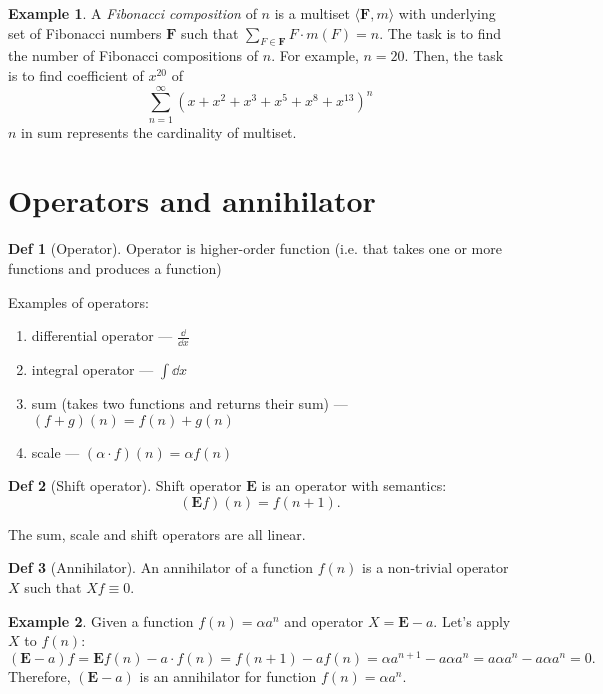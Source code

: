 \documentclass[a4paper]{article}
\theoremstyle{definition}
\newtheorem{definition}{Def}
\newtheorem{example}{Example}[section]
\begin{document}
\newcommand\FBS{\boldsymbol{F}}
\begin{example}
  A \textit{Fibonacci composition} of \(n\) is a multiset \(\langle \FBS, m
  \rangle\) with underlying set of Fibonacci numbers \(\FBS\)
  such that \(\sum_{F \in \FBS} F \cdot m(F) = n\).
  The task is to find the number of Fibonacci compositions of \(n\).
  For example, \(n = 20\).
  Then, the task is to find coefficient of  \(x^{20}\) of
  \[
     \sum_{n = 1}^{\infty} (x + x^2 + x^3 + x^5 + x^8 + x^{13})^n
  \]
  \(n\) in sum represents the cardinality of multiset.
\end{example}



\section{Operators and annihilator}

\begin{definition}[Operator]
  Operator is higher-order function (i.e. that takes one or more functions and
  produces a function)
\end{definition}
Examples of operators:
\begin{enumerate}
  \item differential operator --- \(\frac{\dd}{\dd x}\)
  \item integral operator --- \(\int \dd x\)
  \item sum (takes two functions and returns their sum) ---
    \((f + g)(n) = f(n) + g(n)\)
  \item scale --- \((\alpha \cdot f)(n) = \alpha f(n)\)
\end{enumerate}
\newcommand\EE{\boldsymbol{E}}
\begin{definition}[Shift operator]
  Shift operator \(\EE\) is an operator with semantics:
   \[
    (\EE f)(n) = f(n + 1)
  .\]
\end{definition}
The sum, scale and shift operators are all linear.
\begin{definition}[Annihilator]
  An annihilator of a function \(f(n)\)
  is a non-trivial operator \(X\)
  such that \(Xf \equiv 0\).
\end{definition}
\begin{example}
  Given a function \(f(n) = \alpha a^n\) and operator  \(X = \EE - a\).
  Let's apply \(X\) to \(f(n)\):
   \[
     (\EE - a)f = \EE f(n) - a \cdot f(n) = f(n + 1) - a f(n)
     = \alpha a^{n + 1} - a \alpha a^n
     = a \alpha a^n - a \alpha a^n = 0
  .\]
  Therefore, \((\EE - a)\) is an annihilator for function  \(f(n) = \alpha a^n\).
\end{example}
\end{document}
